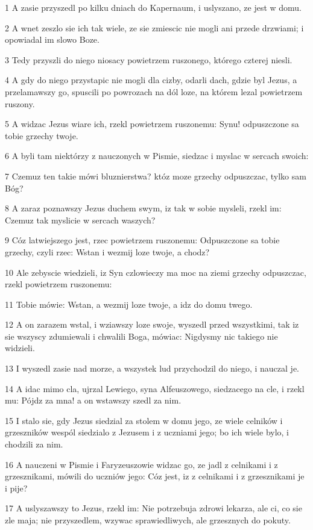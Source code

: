 \par 1 A zasie przyszedl po kilku dniach do Kapernaum, i uslyszano, ze jest w domu.
\par 2 A wnet zeszlo sie ich tak wiele, ze sie zmiescic nie mogli ani przede drzwiami; i opowiadal im slowo Boze.
\par 3 Tedy przyszli do niego niosacy powietrzem ruszonego, którego czterej niesli.
\par 4 A gdy do niego przystapic nie mogli dla cizby, odarli dach, gdzie byl Jezus, a przelamawszy go, spuscili po powrozach na dól loze, na którem lezal powietrzem ruszony.
\par 5 A widzac Jezus wiare ich, rzekl powietrzem ruszonemu: Synu! odpuszczone sa tobie grzechy twoje.
\par 6 A byli tam niektórzy z nauczonych w Pismie, siedzac i myslac w sercach swoich:
\par 7 Czemuz ten takie mówi bluznierstwa? któz moze grzechy odpuszczac, tylko sam Bóg?
\par 8 A zaraz poznawszy Jezus duchem swym, iz tak w sobie mysleli, rzekl im: Czemuz tak myslicie w sercach waszych?
\par 9 Cóz latwiejszego jest, rzec powietrzem ruszonemu: Odpuszczone sa tobie grzechy, czyli rzec: Wstan i wezmij loze twoje, a chodz?
\par 10 Ale zebyscie wiedzieli, iz Syn czlowieczy ma moc na ziemi grzechy odpuszczac, rzekl powietrzem ruszonemu:
\par 11 Tobie mówie: Wstan, a wezmij loze twoje, a idz do domu twego.
\par 12 A on zarazem wstal, i wziawszy loze swoje, wyszedl przed wszystkimi, tak iz sie wszyscy zdumiewali i chwalili Boga, mówiac: Nigdysmy nic takiego nie widzieli.
\par 13 I wyszedl zasie nad morze, a wszystek lud przychodzil do niego, i nauczal je.
\par 14 A idac mimo cla, ujrzal Lewiego, syna Alfeuszowego, siedzacego na cle, i rzekl mu: Pójdz za mna! a on wstawszy szedl za nim.
\par 15 I stalo sie, gdy Jezus siedzial za stolem w domu jego, ze wiele celników i grzeszników wespól siedzialo z Jezusem i z uczniami jego; bo ich wiele bylo, i chodzili za nim.
\par 16 A nauczeni w Pismie i Faryzeuszowie widzac go, ze jadl z celnikami i z grzesznikami, mówili do uczniów jego: Cóz jest, iz z celnikami i z grzesznikami je i pije?
\par 17 A uslyszawszy to Jezus, rzekl im: Nie potrzebuja zdrowi lekarza, ale ci, co sie zle maja; nie przyszedlem, wzywac sprawiedliwych, ale grzesznych do pokuty.
